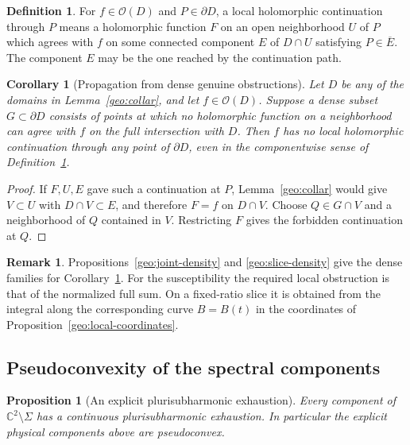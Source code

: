 \documentclass[11pt]{article}
\numberwithin{equation}{section}
\newtheorem{proposition}[theorem]{Proposition}
\newtheorem{corollary}[theorem]{Corollary}
\theoremstyle{definition}
\newtheorem{definition}[theorem]{Definition}
\newtheorem{remark}[theorem]{Remark}
\newcommand{\C}{\mathbb C}
\begin{document}
\begin{definition}\label{geo:componentwise-extension}
For \(f\in\mathcal O(D)\) and \(P\in\partial D\), a local
holomorphic continuation through \(P\) means a
holomorphic function \(F\) on an open neighborhood \(U\)
of \(P\) which agrees with \(f\) on some connected
component \(E\) of \(D\cap U\) satisfying
\(P\in\overline E\).
The component \(E\) may be the one reached by the continuation path.
\end{definition}

\begin{corollary}[Propagation from dense genuine obstructions]
\label{geo:propagate-obstruction}
Let \(D\) be any of the domains in
Lemma~\ref{geo:collar}, and let \(f\in\mathcal O(D)\).
Suppose a dense subset \(G\subset\partial D\) consists
of points at which no holomorphic function on a
neighborhood can agree with \(f\) on the full
intersection with \(D\).  Then \(f\) has no local
holomorphic continuation through any point of
\(\partial D\), even in the componentwise sense of
Definition~\ref{geo:componentwise-extension}.
\end{corollary}

\begin{proof}
If \(F,U,E\) gave such a continuation at \(P\),
Lemma~\ref{geo:collar} would give \(V\subset U\)
with \(D\cap V\subset E\), and therefore \(F=f\)
on \(D\cap V\).  Choose \(Q\in G\cap V\) and a
neighborhood of \(Q\) contained in \(V\).  Restricting
\(F\) gives the forbidden continuation at \(Q\).
\end{proof}

\begin{remark}\label{geo:scope-nonextension}
Propositions~\ref{geo:joint-density} and \ref{geo:slice-density}
give the dense families for Corollary~\ref{geo:propagate-obstruction}.
For the susceptibility the required local obstruction is that of
the normalized full sum. On a fixed-ratio slice it is obtained
from the integral along the corresponding curve \(B=B(t)\) in the
coordinates of Proposition~\ref{geo:local-coordinates}.
\end{remark}

\subsection{Pseudoconvexity of the spectral components}
\label{geo:psh-section}

\begin{proposition}[An explicit plurisubharmonic exhaustion]
\label{geo:pseudoconvex}
Every component of \(\C^2\setminus\Sigma\) has a continuous
plurisubharmonic exhaustion.  In particular the explicit
physical components above are pseudoconvex.
\end{proposition}
\end{document}
